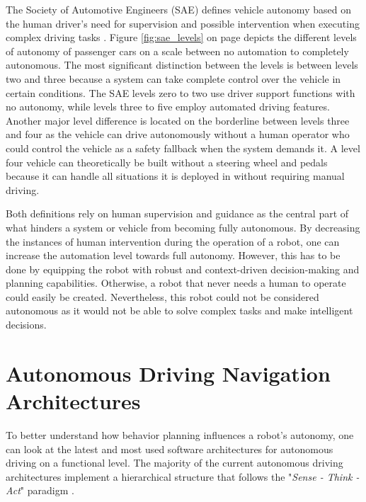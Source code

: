The Society of Automotive Engineers (SAE) defines vehicle autonomy based on the human driver's need for supervision and possible intervention when executing complex driving tasks \cite{J3016_202104}. Figure \ref{fig:sae_levels} on page \pageref{fig:sae_levels} depicts the different levels of autonomy of passenger cars on a scale between no automation to completely autonomous. The most significant distinction between the levels is between levels two and three because a system can take complete control over the vehicle in certain conditions. The SAE levels zero to two use driver support functions with no autonomy, while levels three to five employ automated driving features.
Another major level difference is located on the borderline between levels three and four as the vehicle can drive autonomously without a human operator who could control the vehicle as a safety fallback when the system demands it. A level four vehicle can theoretically be built without a steering wheel and pedals because it can handle all situations it is deployed in without requiring manual driving. 

Both definitions rely on human supervision and guidance as the central part of what hinders a system or vehicle from becoming fully autonomous. By decreasing the instances of human intervention during the operation of a robot, one can increase the automation level towards full autonomy. However, this has to be done by equipping the robot with robust and context-driven decision-making and planning capabilities. Otherwise, a robot that never needs a human to operate could easily be created. Nevertheless, this robot could not be considered autonomous as it would not be able to solve complex tasks and make intelligent decisions.



\section{Autonomous Driving Navigation Architectures}
\label{sec:Autonomous Driving Navigation Architectures}

To better understand how behavior planning influences a robot's autonomy, one can look at the latest and most used software architectures for autonomous driving on a functional level. The majority of the current autonomous driving architectures implement a hierarchical structure that follows the "\textit{Sense - Think - Act}" paradigm \cite{murphy2000}. 

